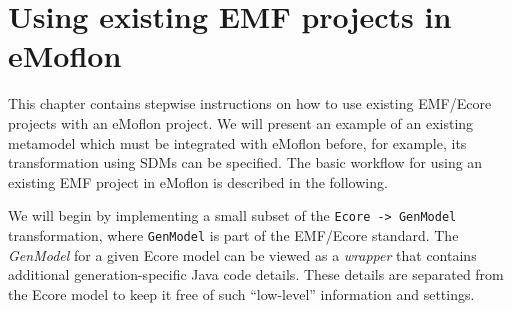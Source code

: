 \newpage

\section{Using existing EMF projects in eMoflon}
\genHeader

This chapter contains stepwise instructions on how to use existing \mbox{EMF}/Ecore projects with an eMoflon project.
We will present an example of an existing metamodel which must be integrated with eMoflon before, for example, its transformation using SDMs can be
specified. The basic workflow for using an existing EMF project in eMoflon is described in the following. 

We will begin by implementing a small subset of the \texttt{Ecore -> GenModel} transformation, where \texttt{GenModel} is part of the EMF/Ecore standard. The
\emph{GenModel} for a given Ecore model can be viewed as a \emph{wrapper} that contains additional generation-specific Java code details. These details are
separated from the Ecore model to keep it free of such ``low-level'' information and settings.




